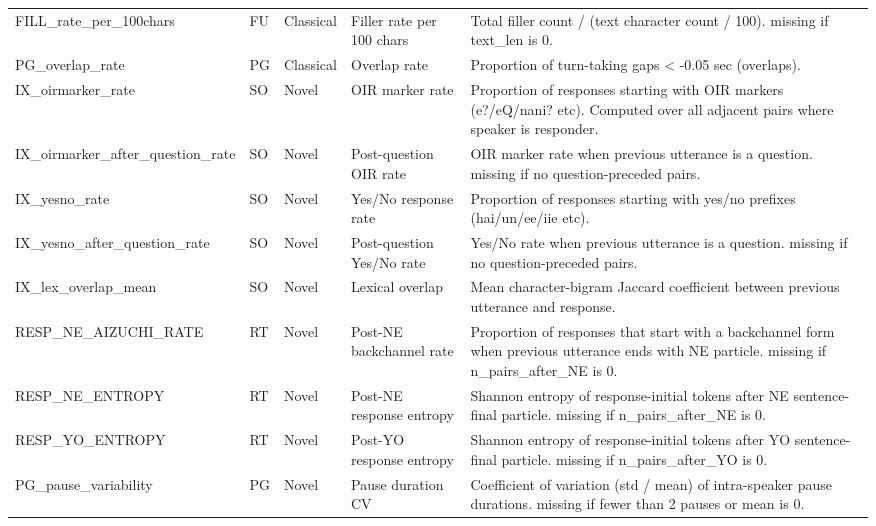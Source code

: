 {\begin{longtable}{lllp{1.9cm}p{3.6cm}}
FILL\_rate\_per\_100chars & FU & Classical & Filler rate per 100 chars & Total filler count / (text character count / 100). missing if text\_len is 0. \\
PG\_overlap\_rate & PG & Classical & Overlap rate & Proportion of turn-taking gaps < -0.05 sec (overlaps). \\
IX\_oirmarker\_rate & SO & Novel & OIR marker rate & Proportion of responses starting with OIR markers (e?/eQ/nani? etc). Computed over all adjacent pairs where speaker is responder. \\
IX\_oirmarker\_after\_question\_rate & SO & Novel & Post-question OIR rate & OIR marker rate when previous utterance is a question. missing if no question-preceded pairs. \\
IX\_yesno\_rate & SO & Novel & Yes/No response rate & Proportion of responses starting with yes/no prefixes (hai/un/ee/iie etc). \\
IX\_yesno\_after\_question\_rate & SO & Novel & Post-question Yes/No rate & Yes/No rate when previous utterance is a question. missing if no question-preceded pairs. \\
IX\_lex\_overlap\_mean & SO & Novel & Lexical overlap & Mean character-bigram Jaccard coefficient between previous utterance and response. \\
RESP\_NE\_AIZUCHI\_RATE & RT & Novel & Post-NE backchannel rate & Proportion of responses that start with a backchannel form when previous utterance ends with NE particle. missing if n\_pairs\_after\_NE is 0. \\
RESP\_NE\_ENTROPY & RT & Novel & Post-NE response entropy & Shannon entropy of response-initial tokens after NE sentence-final particle. missing if n\_pairs\_after\_NE is 0. \\
RESP\_YO\_ENTROPY & RT & Novel & Post-YO response entropy & Shannon entropy of response-initial tokens after YO sentence-final particle. missing if n\_pairs\_after\_YO is 0. \\
PG\_pause\_variability & PG & Novel & Pause duration CV & Coefficient of variation (std / mean) of intra-speaker pause durations. missing if fewer than 2 pauses or mean is 0. \\
\end{longtable}
}
